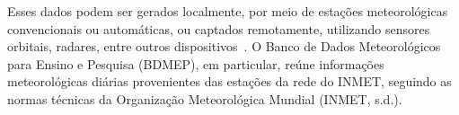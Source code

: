     Esses dados podem ser gerados localmente, por meio de estações meteorológicas convencionais ou automáticas, 
    ou captados remotamente, utilizando sensores orbitais, radares, entre outros dispositivos~\cite{vianna2017}. 
    O Banco de Dados Meteorológicos para Ensino e Pesquisa (BDMEP), em particular, reúne informações meteorológicas 
    diárias provenientes das estações da rede do INMET, seguindo as normas técnicas da Organização Meteorológica 
    Mundial (INMET, s.d.).